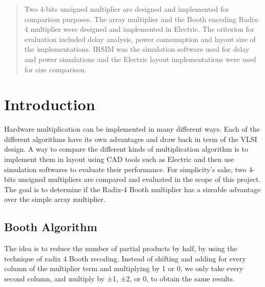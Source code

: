 \documentclass[conference]{IEEEtran}
\begin{document}




\maketitle

\begin{abstract}
Two 4-bits unsigned multiplier are designed and implemented for comparison purposes. The array multiplier and the Booth encoding Radix-4 multiplier were designed and implemented in Electric. The criterion for evaluation included delay analysis, power comsumption and layout size of the implementations. IRSIM was the simulation software used for delay and power simulations and the Electric layout implementations were used for size comparison.
\end{abstract}





%
\IEEEpeerreviewmaketitle



\section{Introduction}
Hardware multiplication can be implemented in many different ways. Each of the different algorithms have its own advantages and draw back in term of the VLSI design. A way to compare the different kinds of multiplication algorithm is to implement them in layout using CAD tools such as Electric and then use simulation softwares to evaluate their performance. For simplicity's sake, two 4-bits unsigned multipliers are compared and evaluated in the scope of this project. The goal is to determine if the Radix-4 Booth multiplier has a sizeable advantage over the simple array multiplier.

\subsection{Booth Algorithm}
The idea is to reduce the number of partial products by half, by using the technique of radix 4 Booth recoding​. Instead of shifting and adding for every column of the multiplier term and multiplying by 1 or 0, we only take every second column, and multiply by ±1, ±2, or 0, to obtain the same results. ​\\
\end{document}
